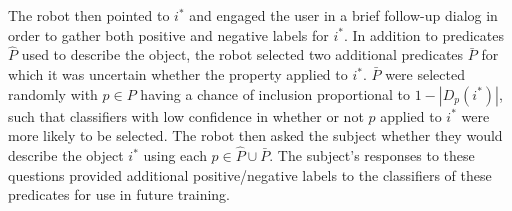 The robot then pointed to $i^*$ and engaged the user in a brief follow-up dialog in order to gather both positive and negative labels for $i^*$.
In addition to predicates $\hat{P}$ used to describe the object, the robot selected two additional predicates $\bar{P}$ for which it was uncertain whether the property applied to $i^*$.
$\bar{P}$ were selected randomly with $p\in P$ having a chance of inclusion proportional to $1-|D_p(i^*)|$, such that classifiers with low confidence in whether or not $p$ applied to $i^*$ were more likely to be selected.
The robot then asked the subject whether they would describe the object $i^*$ using each $p\in\hat{P}\cup\bar{P}$.
The subject's responses to these questions provided additional positive/negative labels to the classifiers of these predicates for use in future training.
